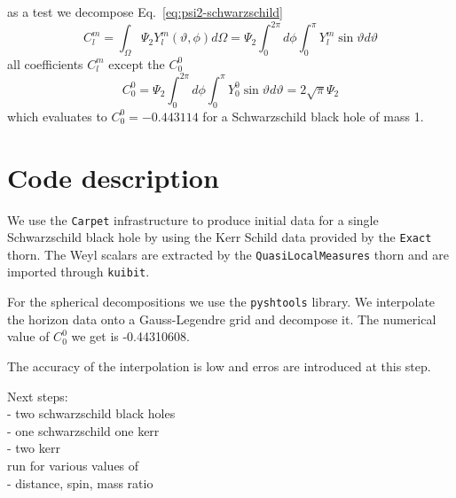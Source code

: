 \documentclass[reprint, prd, nofootinbib, superscriptaddress, floatfix]{revtex4-2}  %
\newcommand{\eq}[1]{Eq.\ \eqref{#1}}
\begin{document}
as a test we decompose \eq{eq:psi2-schwarzschild}
\begin{equation}
  \label{eq:psi2-expansion}
  C_{l}^{m} = \int_{\Omega} \Psi_{2} Y_{l}^{m}(\vartheta, \phi) d\Omega = \Psi_{2} \int_{0}^{2\pi} d\phi
\int_{0}^{\pi }Y_{l}^{m}\sin\vartheta d\vartheta
\end{equation}
all coefficients $C_{l}^{m}$ except the $C_{0}^{0}$
\begin{equation}
  C_{0}^{0} = \Psi_{2} \int_{0}^{2\pi} d\phi \int_{0}^{\pi }Y_{0}^{0}\sin\vartheta d\vartheta = 2\sqrt{\pi} \Psi_{2}
\end{equation}
which evaluates to $C_{0}^{0}=-0.443114$ for a Schwarzschild black hole of mass 1.

\section{Code description}
We use the \texttt{Carpet} infrastructure to produce initial data for a single Schwarzschild black hole by using the Kerr Schild data provided by the \texttt{Exact} thorn. The Weyl scalars are extracted by the \texttt{QuasiLocalMeasures} thorn and are imported through \texttt{kuibit}.

For the spherical decompositions we use the \texttt{pyshtools} library.
We interpolate the horizon data onto a Gauss-Legendre grid and decompose it.
The numerical value of $C_{0}^{0}$ we get is -0.44310608.

The accuracy of the interpolation is low and erros are introduced at this step.


Next steps:\\
- two schwarzschild black holes\\
- one schwarzschild one kerr\\
- two kerr\\

run for various values of\\
- distance, spin, mass ratio
\end{document}
